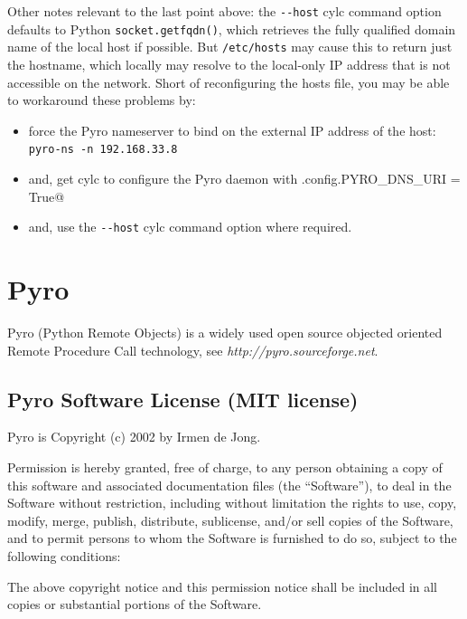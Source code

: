 \documentclass[11pt,a4paper]{article}
\begin{document}
Other notes relevant to the last point above: the \lstinline=--host=
cylc command option defaults to Python \lstinline=socket.getfqdn()=,
which retrieves the fully qualified domain name of the local host
if possible.  But \lstinline=/etc/hosts= may cause this to return
just the hostname, which locally may resolve to the local-only IP
address that is not accessible on the network.  Short of reconfiguring
the hosts file, you may be able to workaround these problems by:

\begin{itemize}

    \item force the Pyro nameserver to bind on the external IP address
        of the host: \lstinline=pyro-ns -n 192.168.33.8=

    \item and, get cylc to configure the Pyro daemon 
        with \lstinline@Pyro.config.PYRO_DNS_URI = True@ 
        
    \item and, use the \lstinline=--host= cylc command option where
        required.

\end{itemize}

        
\section{Pyro} 
\label{Pyro}

Pyro (Python Remote Objects) is a widely used open source objected
oriented Remote Procedure Call technology, see {\em
http://pyro.sourceforge.net}.

\subsection{Pyro Software License (MIT license)}
\label{PyroSoftwareLicense(MITlicense)}

Pyro is Copyright (c) 2002  by Irmen de Jong.

Permission is hereby granted, free of charge, to any person obtaining a
copy of this software and associated documentation files (the
``Software''), to deal in the Software without restriction, including
without limitation the rights to use, copy, modify, merge, publish,
distribute, sublicense, and/or sell copies of the Software, and to
permit persons to whom the Software is furnished to do so, subject to
the following conditions:

The above copyright notice and this permission notice shall be included
in all copies or substantial portions of the Software.
\end{document}
